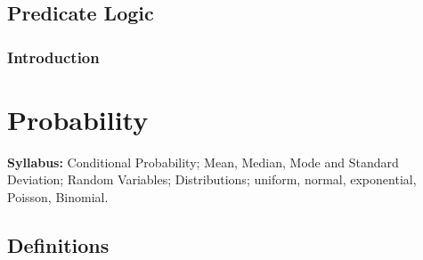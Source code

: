 \documentclass[a4paper,oneside]{book}
\begin{document}
\chapter{Predicate Logic}
\section{Introduction}


\part{Probability}
{\large{\textbf{Syllabus:}}} Conditional Probability; Mean, Median, Mode and Standard Deviation; Random Variables; Distributions; uniform, normal, exponential, Poisson, Binomial.
\chapter{Definitions}
\end{document}
